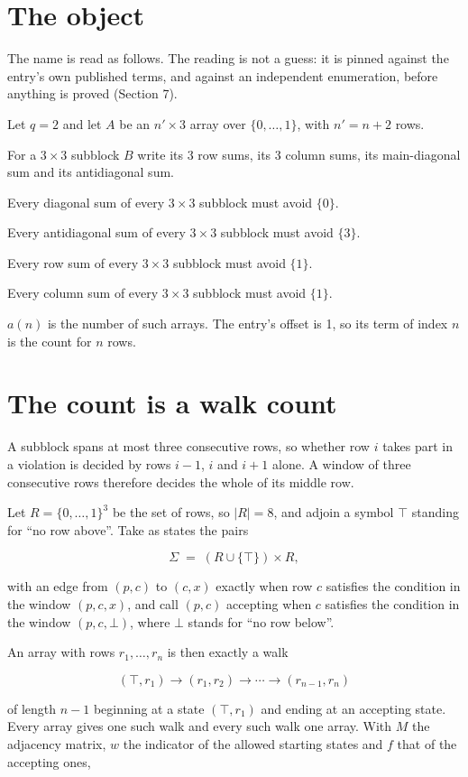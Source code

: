 \documentclass[11pt]{article}
\theoremstyle{definition}
\begin{document}
\section{The object}

The name is read as follows. The reading is not a guess: it is pinned against the entry's own published terms, and against an independent enumeration, before anything is proved (Section 7).

Let $q = 2$ and let $A$ be an $n' \times 3$ array over $\{0,\dots,1\}$, with $n' = n + 2$ rows.

For a $3\times3$ subblock $B$ write its 3 row sums, its 3 column sums, its main-diagonal sum and its antidiagonal sum.

Every diagonal sum of every $3\times3$ subblock must avoid $\{0\}$.

Every antidiagonal sum of every $3\times3$ subblock must avoid $\{3\}$.

Every row sum of every $3\times3$ subblock must avoid $\{1\}$.

Every column sum of every $3\times3$ subblock must avoid $\{1\}$.

$a(n)$ is the number of such arrays. The entry's offset is 1, so its term of index $n$ is the count for $n$ rows.

\section{The count is a walk count}

A subblock spans at most three consecutive rows, so whether row $i$ takes part in a violation is decided by rows $i-1$, $i$ and $i+1$ alone. A window of three consecutive rows therefore decides the whole of its middle row.

Let $R = \{0,\dots,1\}^{3}$ be the set of rows, so $|R| = 8$, and adjoin a symbol $\top$ standing for ``no row above''. Take as states the pairs

\[\Sigma \;=\; (R \cup \{\top\}) \times R,\]

with an edge from $(p,c)$ to $(c,x)$ exactly when row $c$ satisfies the condition in the window $(p,c,x)$, and call $(p,c)$ accepting when $c$ satisfies the condition in the window $(p,c,\bot)$, where $\bot$ stands for ``no row below''.

An array with rows $r_1,\dots,r_n$ is then exactly a walk

\[(\top,r_1) \to (r_1,r_2) \to \cdots \to (r_{n-1},r_n)\]

of length $n-1$ beginning at a state $(\top,r_1)$ and ending at an accepting state. Every array gives one such walk and every such walk one array. With $M$ the adjacency matrix, $w$ the indicator of the allowed starting states and $f$ that of the accepting ones,
\end{document}
